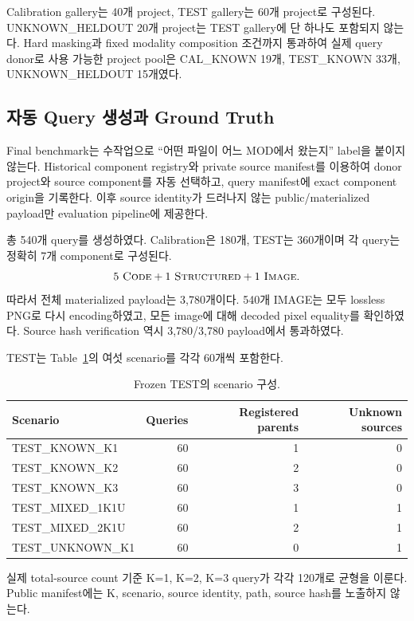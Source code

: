 \documentclass[runningheads]{llncs}
\begin{document}
Calibration gallery는 40개 project, TEST gallery는 60개 project로 구성된다. UNKNOWN\_HELDOUT 20개 project는 TEST gallery에 단 하나도 포함되지 않는다. Hard masking과 fixed modality composition 조건까지 통과하여 실제 query donor로 사용 가능한 project pool은 CAL\_KNOWN 19개, TEST\_KNOWN 33개, UNKNOWN\_HELDOUT 15개였다.

\subsection{자동 Query 생성과 Ground Truth}

Final benchmark는 수작업으로 ``어떤 파일이 어느 MOD에서 왔는지'' label을 붙이지 않는다. Historical component registry와 private source manifest를 이용하여 donor project와 source component를 자동 선택하고, query manifest에 exact component origin을 기록한다. 이후 source identity가 드러나지 않는 public/materialized payload만 evaluation pipeline에 제공한다.

총 540개 query를 생성하였다. Calibration은 180개, TEST는 360개이며 각 query는 정확히 7개 component로 구성된다.
\[
5\ \textsc{Code}
+
1\ \textsc{Structured}
+
1\ \textsc{Image}.
\]
따라서 전체 materialized payload는 3,780개이다. 540개 IMAGE는 모두 lossless PNG로 다시 encoding하였고, 모든 image에 대해 decoded pixel equality를 확인하였다. Source hash verification 역시 3,780/3,780 payload에서 통과하였다.


TEST는 Table~\ref{tab:scenario}의 여섯 scenario를 각각 60개씩 포함한다.

\begin{table}[!htbp]
\centering
\caption{Frozen TEST의 scenario 구성.}
\label{tab:scenario}
\scriptsize
\begin{tabular}{lrrr}
\toprule
Scenario & Queries & Registered parents & Unknown sources\\
\midrule
TEST\_KNOWN\_K1 & 60 & 1 & 0\\
TEST\_KNOWN\_K2 & 60 & 2 & 0\\
TEST\_KNOWN\_K3 & 60 & 3 & 0\\
TEST\_MIXED\_1K1U & 60 & 1 & 1\\
TEST\_MIXED\_2K1U & 60 & 2 & 1\\
TEST\_UNKNOWN\_K1 & 60 & 0 & 1\\
\bottomrule
\end{tabular}
\end{table}

실제 total-source count 기준 K=1, K=2, K=3 query가 각각 120개로 균형을 이룬다. Public manifest에는 K, scenario, source identity, path, source hash를 노출하지 않는다.
\end{document}
